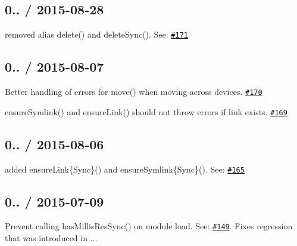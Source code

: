 \subsection*{0.. / 2015-\/08-\/28 }


\begin{DoxyItemize}
\item removed alias {\ttfamily delete()} and {\ttfamily delete\+Sync()}. See\+: \href{https://github.com/jprichardson/node-fs-extra/issues/171}{\tt \#171}
\end{DoxyItemize}

\subsection*{0.. / 2015-\/08-\/07 }


\begin{DoxyItemize}
\item Better handling of errors for {\ttfamily move()} when moving across devices. \href{https://github.com/jprichardson/node-fs-extra/pull/170}{\tt \#170}
\item {\ttfamily ensure\+Symlink()} and {\ttfamily ensure\+Link()} should not throw errors if link exists. \href{https://github.com/jprichardson/node-fs-extra/pull/169}{\tt \#169}
\end{DoxyItemize}

\subsection*{0.. / 2015-\/08-\/06 }


\begin{DoxyItemize}
\item added {\ttfamily ensure\+Link\{Sync\}()} and {\ttfamily ensure\+Symlink\{Sync\}()}. See\+: \href{https://github.com/jprichardson/node-fs-extra/pull/165}{\tt \#165}
\end{DoxyItemize}

\subsection*{0.. / 2015-\/07-\/09 }


\begin{DoxyItemize}
\item Prevent calling {\ttfamily has\+Millis\+Res\+Sync()} on module load. See\+: \href{https://github.com/jprichardson/node-fs-extra/issues/149}{\tt \#149}. Fixes regression that was introduced in {..}.
\end{DoxyItemize}


